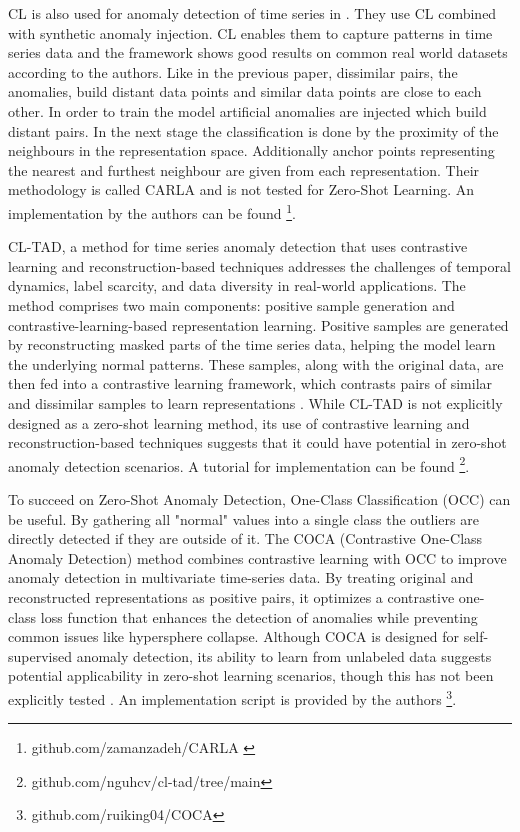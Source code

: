 CL is also used for anomaly detection of time series in \cite{darban_carla_2024}. They use CL combined with synthetic anomaly injection. CL enables them to capture patterns in time series data and the framework shows good results on common real world datasets according to the authors. Like in the previous paper, dissimilar pairs, the anomalies, build distant data points and similar data points are close to each other. In order to train the model artificial anomalies are injected which build distant pairs. In the next stage the classification is done by  the proximity of the neighbours in the representation space. Additionally anchor points representing the nearest and furthest neighbour are given from each representation. Their methodology is called CARLA and is not tested for Zero-Shot Learning. An implementation by the authors can be found \footnote{\fussy\tiny github.com/zamanzadeh/CARLA \label{foot_carla}}.

CL-TAD, a method for time series anomaly detection that uses contrastive learning and reconstruction-based techniques addresses the challenges of temporal dynamics, label scarcity, and data diversity in real-world applications. The method comprises two main components: positive sample generation and contrastive-learning-based representation learning. Positive samples are generated by reconstructing masked parts of the time series data, helping the model learn the underlying normal patterns. These samples, along with the original data, are then fed into a contrastive learning framework, which contrasts pairs of similar and dissimilar samples to learn representations \cite{ngu_cl-tad_2023}.
While CL-TAD is not explicitly designed as a zero-shot learning method, its use of contrastive learning and reconstruction-based techniques suggests that it could have potential in zero-shot anomaly detection scenarios. A tutorial for implementation can be found \footnote{\fussy\tiny github.com/nguhcv/cl-tad/tree/main}.

To succeed on Zero-Shot Anomaly Detection, One-Class Classification (OCC) can be useful.
By gathering all "normal" values into a single class the outliers are directly detected if they are outside of it.
The COCA (Contrastive One-Class Anomaly Detection) method combines contrastive learning with OCC to improve anomaly detection in multivariate time-series data. By treating original and reconstructed representations as positive pairs, it optimizes a contrastive one-class loss function that enhances the detection of anomalies while preventing common issues like hypersphere collapse. Although COCA is designed for self-supervised anomaly detection, its ability to learn from unlabeled data suggests potential applicability in zero-shot learning scenarios, though this has not been explicitly tested \cite{wang_deep_2023}. An implementation script is provided by the authors \footnote{\fussy\tiny github.com/ruiking04/COCA}.

